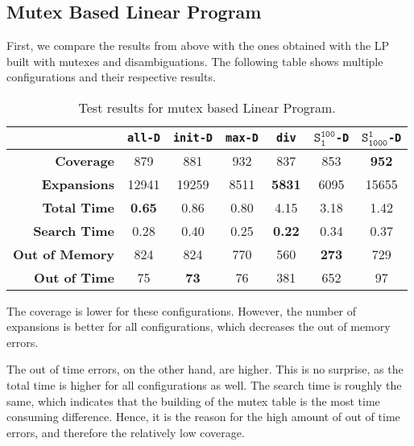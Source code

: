 \subsection{Mutex Based Linear Program}\label{subsec:mutex-based-linear-program}
First, we compare the results from above with the ones obtained with the LP built with mutexes and disambiguations.
The following table shows multiple configurations and their respective results.
\begin{table}[h!]
    \begin{center}
        \begin{tabular}{|r|c|c|c|c|c|c|}
            \hline
            & \textbf{\texttt{all-D}} & \textbf{\texttt{init-D}} & \textbf{\texttt{max-D}} & \textbf{\texttt{div}} & \textbf{$\texttt{S}_\texttt{1}^\texttt{100}$\texttt{-D}}& \textbf{$\texttt{S}_\texttt{1000}^\texttt{1}$\texttt{-D}}\\
            \hline \hline
            \textbf{Coverage} & 879 & 881 & 932 & 837 & 853 & \textbf{952} \\ \hline
            \textbf{Expansions} & 12941 & 19259 & 8511 & \textbf{5831} & 6095 & 15655 \\ \hline
            \textbf{Total Time} & \textbf{0.65} & 0.86 & 0.80 & 4.15 & 3.18 & 1.42 \\ \hline
            \textbf{Search Time} & 0.28 & 0.40 & 0.25 & \textbf{0.22} & 0.34 & 0.37 \\ \hline
            \textbf{Out of Memory} & 824 & 824 & 770 & 560 & \textbf{273} & 729 \\ \hline
            \textbf{Out of Time} & 75 & \textbf{73} & 76 & 381 & 652 & 97 \\ \hline
        \end{tabular}
        \caption{Test results for mutex based Linear Program.}
        \label{table:mutex_lp}
    \end{center}
\end{table}

The coverage is lower for these configurations.
However, the number of expansions is better for all configurations, which decreases the out of memory errors.

The out of time errors, on the other hand, are higher.
This is no surprise, as the total time is higher for all configurations as well.
The search time is roughly the same, which indicates that the building of the mutex table is the most time consuming difference.
Hence, it is the reason for the high amount of out of time errors, and therefore the relatively low coverage.

